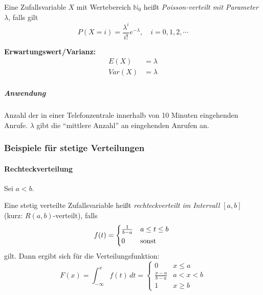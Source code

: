 \documentclass[a4paper, 11pt, accentcolor = tud3b]{tudreport}
\newcommand{\N}{\ensuremath{\mathbb{N}}}
\newcommand{\Var}{\ensuremath{\textit{Var}}}
\begin{document}
                        Eine Zufallsvariable \(X\) mit Wertebereich \( \N_0 \) heißt \textit{Poisson-verteilt mit Parameter \( \lambda \)}, falls gilt
                        \begin{equation*}
	                        P(X = i) = \frac{\lambda^i}{i!} e^{-\lambda}, \quad i = 0, 1, 2, \cdots
                        \end{equation*}
                        
                        \textbf{Erwartungswert/Varianz:}
                        \begin{align*}
                        	E(X)    & = \lambda \\
                        	\Var(X) & = \lambda
                        \end{align*}
                        
                        \subparagraph{Anwendung}
	                        Anzahl der in einer Telefonzentrale innerhalb von 10 Minuten eingehenden Anrufe. \(\lambda\) gibt die \enquote{mittlere Anzahl} an eingehenden Anrufen an.

                \subsubsection{Beispiele für stetige Verteilungen}
                    \paragraph{Rechteckverteilung}
                        Sei \( a < b \).
                        
                        Eine stetig verteilte Zufallsvariable heißt \textit{rechteckverteilt im Intervall \( [a, b] \)} (kurz: \( R(a, b) \)-verteilt), falls
                        \begin{equation*}
	                        f(t) =
	                        \begin{cases*}
		                        \frac{1}{b - a} & \(a \leq t \leq b\) \\
		                        0               & \textrm{sonst}
	                        \end{cases*}
                        \end{equation*}
                        gilt. Dann ergibt sich für die Verteilungsfunktion:
                        \begin{equation*}
	                        F(x) = \int_{-\infty}^{x} \! f(t) \, dt =
	                        \begin{cases}
	                        	0                   & x \leq a  \\
	                        	\frac{x - a}{b - a} & a < x < b \\
	                        	1                   & x \geq b
	                        \end{cases}
                        \end{equation*}
\end{document}
